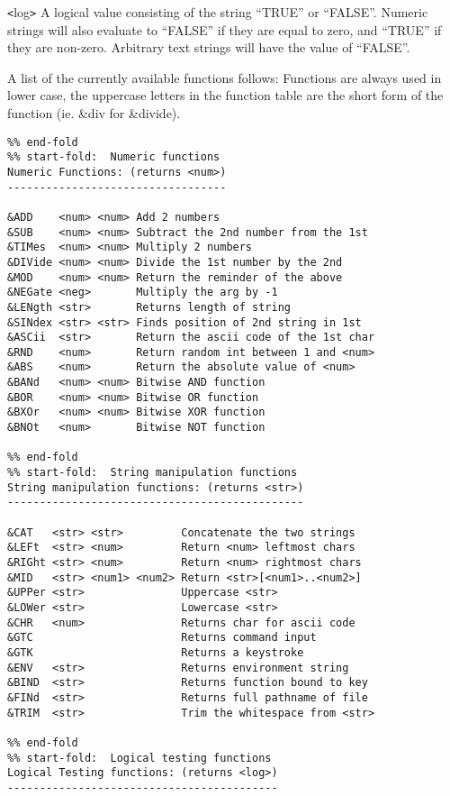 \verb+<+log\verb+>+ A logical value consisting of the string ``TRUE''
or ``FALSE''. Numeric strings will also evaluate to ``FALSE'' if they
are equal to zero, and ``TRUE'' if they are non-zero. Arbitrary text
strings will have the value of ``FALSE''.

A list of the currently available functions follows:
Functions are always used in lower case, the uppercase letters in the
function table are the short form of the function (ie. \&div for
\&divide).

\begin{verbatim}
%% end-fold
%% start-fold:  Numeric functions
Numeric Functions: (returns <num>)
----------------------------------

&ADD    <num> <num> Add 2 numbers
&SUB    <num> <num> Subtract the 2nd number from the 1st
&TIMes  <num> <num> Multiply 2 numbers
&DIVide <num> <num> Divide the 1st number by the 2nd
&MOD    <num> <num> Return the reminder of the above
&NEGate <neg>       Multiply the arg by -1
&LENgth <str>       Returns length of string
&SINdex <str> <str> Finds position of 2nd string in 1st
&ASCii  <str>       Return the ascii code of the 1st char
&RND    <num>       Return random int between 1 and <num>
&ABS    <num>       Return the absolute value of <num>
&BANd   <num> <num> Bitwise AND function
&BOR    <num> <num> Bitwise OR function
&BXOr   <num> <num> Bitwise XOR function
&BNOt   <num>       Bitwise NOT function

%% end-fold
%% start-fold:  String manipulation functions
String manipulation functions: (returns <str>)
----------------------------------------------

&CAT   <str> <str>         Concatenate the two strings
&LEFt  <str> <num>         Return <num> leftmost chars
&RIGht <str> <num>         Return <num> rightmost chars
&MID   <str> <num1> <num2> Return <str>[<num1>..<num2>]
&UPPer <str>               Uppercase <str>
&LOWer <str>               Lowercase <str>
&CHR   <num>               Returns char for ascii code
&GTC                       Returns command input
&GTK                       Returns a keystroke
&ENV   <str>               Returns environment string
&BIND  <str>               Returns function bound to key
&FINd  <str>               Returns full pathname of file
&TRIM  <str>               Trim the whitespace from <str>

%% end-fold
%% start-fold:  Logical testing functions
Logical Testing functions: (returns <log>)
------------------------------------------


\end{verbatim}
